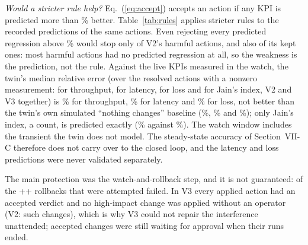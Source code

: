 \documentclass[conference]{IEEEtran}
\begin{document}
\emph{Would a stricter rule help?} Eq.~(\ref{eq:accept}) accepts an action if any KPI is predicted more than \CfgChangePct\% better. Table~\ref{tab:rules} applies stricter rules to the recorded predictions of the same actions. Even rejecting every predicted regression above \CfgChangePct\% would stop only \RuleNoRegHarm{} of V2's \HarmAll{} harmful actions, and also \RuleNoRegKept{} of its \KeptAll{} kept ones: most harmful actions had no predicted regression at all, so the weakness is the prediction, not the rule. Against the live KPIs measured in the watch, the twin's median relative error (over the resolved actions with a nonzero measurement: \LiveThrN{} for throughput, \LiveLatN{} for latency, \LiveLossN{} for loss and \LiveJainN{} for Jain's index, V2 and V3 together) is \LiveThrErr\% for throughput, \LiveLatErr\% for latency and \LiveLossErr\% for loss, not better than the twin's own simulated ``nothing changes'' baseline (\LiveThrBase\%, \LiveLatBase\% and \LiveLossBase\%); only Jain's index, a count, is predicted exactly (\LiveJainErr\% against \LiveJainBase\%). The watch window includes the transient the twin does not model. The steady-state accuracy of Section~VII-C therefore does not carry over to the closed loop, and the latency and loss predictions were never validated separately.

The main protection was the watch-and-rollback step, and it is not guaranteed: \RbFailAll{} of the \the\numexpr\LedVtwoRolledBack+\LedVthreeRolledBack+\RbFailAll\relax{} rollbacks that were attempted failed. In V3 every applied action had an accepted verdict and no high-impact change was applied without an operator (V2: \SafeVtwoHighImpactUnapproved{} such changes), which is why V3 could not repair the interference unattended; \LedVthreeWaiting{} accepted changes were still waiting for approval when their runs ended.

\begin{table}[t]
\caption{Fate of every action in the passed runs (nine runs per variant), from the executor ledgers. V2 applies actions whatever the twin said (the twin had rejected \SafeVtwoAppliedTwinRejected{} of them), so none shows as rejected there.}
\label{tab:actions}
\centering

\end{table}

\begin{table}[t]
\caption{Stricter acceptance rules applied to the recorded predictions of V2's resolved actions: how many harmful actions each would have rejected, and how many kept ones.}
\label{tab:rules}
\centering\small

\end{table}
\end{document}
